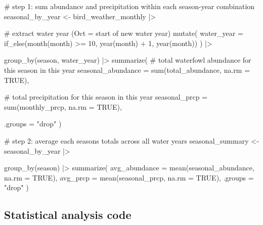 \documentclass[
  letterpaper,
  DIV=11,
  numbers=noendperiod]{scrartcl}
\newenvironment{Shaded}{\begin{snugshade}}{\end{snugshade}}
\newcommand{\AttributeTok}[1]{\textcolor[rgb]{0.40,0.45,0.13}{#1}}
\newcommand{\CommentTok}[1]{\textcolor[rgb]{0.37,0.37,0.37}{#1}}
\newcommand{\ConstantTok}[1]{\textcolor[rgb]{0.56,0.35,0.01}{#1}}
\newcommand{\DecValTok}[1]{\textcolor[rgb]{0.68,0.00,0.00}{#1}}
\newcommand{\FunctionTok}[1]{\textcolor[rgb]{0.28,0.35,0.67}{#1}}
\newcommand{\NormalTok}[1]{\textcolor[rgb]{0.00,0.23,0.31}{#1}}
\newcommand{\OtherTok}[1]{\textcolor[rgb]{0.00,0.23,0.31}{#1}}
\newcommand{\SpecialCharTok}[1]{\textcolor[rgb]{0.37,0.37,0.37}{#1}}
\newcommand{\StringTok}[1]{\textcolor[rgb]{0.13,0.47,0.30}{#1}}
\begin{document}
\begin{Shaded}
\begin{Highlighting}[]
\CommentTok{\# step 1: sum abundance and precipitation within each season{-}year combination}
\NormalTok{seasonal\_by\_year }\OtherTok{\textless{}{-}}\NormalTok{ bird\_weather\_monthly }\SpecialCharTok{|\textgreater{}}

  \CommentTok{\# extract water year (Oct = start of new water year)}
  \FunctionTok{mutate}\NormalTok{(}
    \AttributeTok{water\_year =} \FunctionTok{if\_else}\NormalTok{(}\FunctionTok{month}\NormalTok{(month) }\SpecialCharTok{\textgreater{}=} \DecValTok{10}\NormalTok{,}
                         \FunctionTok{year}\NormalTok{(month) }\SpecialCharTok{+} \DecValTok{1}\NormalTok{,}
                         \FunctionTok{year}\NormalTok{(month))}
\NormalTok{  ) }\SpecialCharTok{|\textgreater{}}

  \FunctionTok{group\_by}\NormalTok{(season, water\_year) }\SpecialCharTok{|\textgreater{}}
  \FunctionTok{summarize}\NormalTok{(}
    \CommentTok{\# total waterfowl abundance for this season in this year}
    \AttributeTok{seasonal\_abundance =} \FunctionTok{sum}\NormalTok{(total\_abundance, }\AttributeTok{na.rm =} \ConstantTok{TRUE}\NormalTok{),}

    \CommentTok{\# total precipitation for this season in this year}
    \AttributeTok{seasonal\_prcp =} \FunctionTok{sum}\NormalTok{(monthly\_prcp, }\AttributeTok{na.rm =} \ConstantTok{TRUE}\NormalTok{),}

    \AttributeTok{.groups =} \StringTok{"drop"}
\NormalTok{  )}

\CommentTok{\# step 2: average each season\textquotesingle{}s totals across all water years}
\NormalTok{seasonal\_summary }\OtherTok{\textless{}{-}}\NormalTok{ seasonal\_by\_year }\SpecialCharTok{|\textgreater{}}

  \FunctionTok{group\_by}\NormalTok{(season) }\SpecialCharTok{|\textgreater{}}
  \FunctionTok{summarize}\NormalTok{(}
    \AttributeTok{avg\_abundance =} \FunctionTok{mean}\NormalTok{(seasonal\_abundance, }\AttributeTok{na.rm =} \ConstantTok{TRUE}\NormalTok{),}
    \AttributeTok{avg\_prcp      =} \FunctionTok{mean}\NormalTok{(seasonal\_prcp, }\AttributeTok{na.rm =} \ConstantTok{TRUE}\NormalTok{),}
    \AttributeTok{.groups =} \StringTok{"drop"}
\NormalTok{  )}
\end{Highlighting}
\end{Shaded}

\subsection{Statistical analysis code}\label{statistical-analysis-code}
\end{document}
